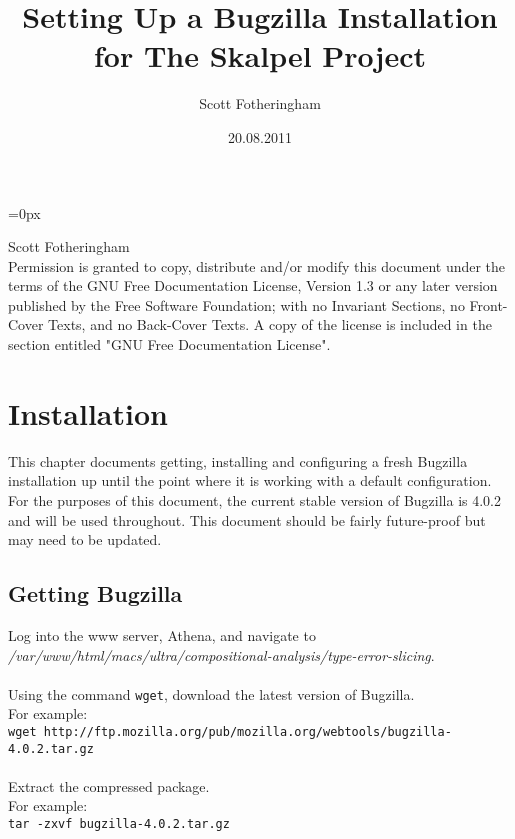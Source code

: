 \documentclass[11pt, a4paper]{report}%
\begin{document}
\parindent=0px
\title{Setting Up a Bugzilla Installation for The Skalpel Project}
\author{Scott Fotheringham}
\date{20.08.2011}
\maketitle
\vspace{110mm}
\small{
\noindent {} Scott Fotheringham
\\
Permission is granted to copy, distribute and/or modify this document
under the terms of the GNU Free Documentation License, Version 1.3 or
any later version published by the Free Software Foundation; with no
Invariant Sections, no Front-Cover Texts, and no Back-Cover Texts.  A
copy of the license is included in the section entitled "GNU Free
Documentation License".}

\newenvironment{changemargin}[2]{
	\begin{list}{}{\setlength{\leftmargin}{#1}
				   \setlength{\rightmargin}{#2}}
				   \item[]}{
	\end{list}}

\onehalfspacing

\tableofcontents

\chapter{Installation}
\label{ch:install}
This chapter documents getting, installing and configuring a fresh Bugzilla installation up until the point where it is working with a default configuration.
For the purposes of this document, the current stable version of Bugzilla is 4.0.2 and will be used throughout. This document should be fairly future-proof but may need to be updated.

\section{Getting Bugzilla}
\label{sec:getbugzilla}
Log into the www server, Athena, and navigate to\\\emph{/var/www/html/macs/ultra/compositional-analysis/type-error-slicing}.\\\\
Using the command {\tt wget}, download the latest version of Bugzilla.\\For example:\\{\tt wget http://ftp.mozilla.org/pub/mozilla.org/webtools/bugzilla-4.0.2.tar.gz}\\
\\
Extract the compressed package.\\For example:\\{\tt tar -zxvf bugzilla-4.0.2.tar.gz}
\end{document}
